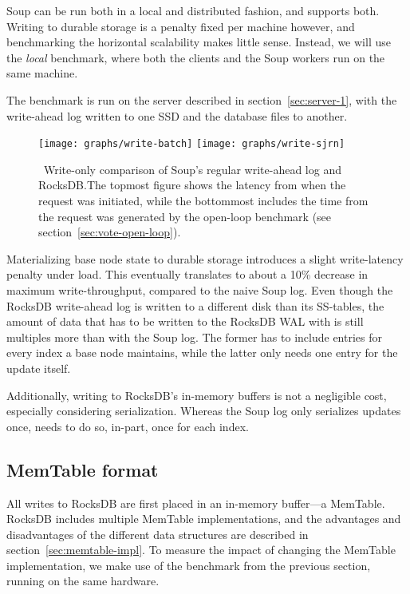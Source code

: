 Soup can be run both in a local and distributed fashion, and 
supports both. Writing to durable storage is a penalty fixed per machine
however, and benchmarking the horizontal scalability makes little sense.
Instead, we will use the \textit{local}  benchmark, where both the
clients and the Soup workers run on the same machine.

The benchmark is run on the server described in section~\ref{sec:server-1}, with
the write-ahead log written to one SSD and the database files to another.

\begin{figure}[H]
  \texttt{[image: graphs/write-batch]}
  \texttt{[image: graphs/write-sjrn]}
  \caption{\
    Write-only comparison of Soup's regular write-ahead log and RocksDB.\@ The
    topmost figure shows the latency from when the request was initiated, while
    the bottommost includes the time from the request was generated by the
    open-loop benchmark (see section~\ref{sec:vote-open-loop}).
  }\label{fig:graph-write}
\end{figure}

Materializing base node state to durable storage introduces a slight
write-latency penalty under load. This eventually translates to about a 10\%
decrease in maximum write-throughput, compared to the naive Soup log. Even
though the RocksDB write-ahead log is written to a different disk than its
SS-tables, the amount of data that has to be written to the RocksDB WAL with
\code{PersistentState} is still multiples more than with the Soup log. The
former has to include entries for every index a base node maintains, while the
latter only needs one entry for the update itself.

Additionally, writing to RocksDB's in-memory buffers is not a negligible cost,
especially considering serialization. Whereas the Soup log only serializes
updates once, \code{PersistentState} needs to do so, in-part, once for each
index.

\subsection{MemTable format}

All writes to RocksDB are first placed in an in-memory buffer---a MemTable.
RocksDB includes multiple MemTable implementations, and the advantages and
disadvantages of the different data structures are described in
section~\ref{sec:memtable-impl}. To measure the impact of changing the MemTable
implementation, we make use of the \code{vote} benchmark from the previous
section, running on the same hardware.

